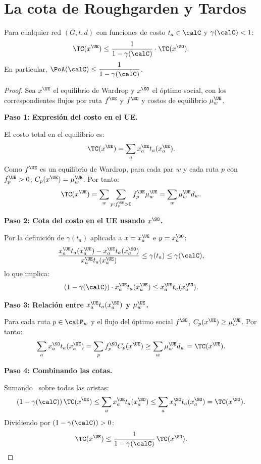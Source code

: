 \section{La cota de Roughgarden y Tardos}

\begin{theorem}\label{thm:roughgarden_tardos}
Para cualquier red $(G, t, d)$ con funciones de costo $t_a \in \calC$ y $\gamma(\calC) < 1$:
\[
\TC(x^{\UE}) \leq \frac{1}{1 - \gamma(\calC)} \cdot \TC(x^{\SO}).
\]
En particular, $\PoA(\calC) \leq \dfrac{1}{1 - \gamma(\calC)}$.
\end{theorem}

\begin{proof}
Sea $x^{\UE}$ el equilibrio de Wardrop y $x^{\SO}$ el óptimo social, con los correspondientes flujos por ruta $f^{\UE}$ y $f^{\SO}$ y costos de equilibrio $\mu_w^{\UE}$.

\textbf{Paso 1: Expresión del costo en el UE.}

El costo total en el equilibrio es:
\[
\TC(x^{\UE}) = \sum_{a} x_a^{\UE} t_a(x_a^{\UE}).
\]
Como $f^{\UE}$ es un equilibrio de Wardrop, para cada par $w$ y cada ruta $p$ con $f_p^{\UE} > 0$, $C_p(x^{\UE}) = \mu_w^{\UE}$. Por tanto:
\[
\TC(x^{\UE}) = \sum_w \sum_{p: f_p^{\UE} > 0} f_p^{\UE} \mu_w^{\UE} = \sum_w \mu_w^{\UE} d_w.
\]

\textbf{Paso 2: Cota del costo en el UE usando $x^{\SO}$.}

Por la definición de $\gamma(t_a)$ aplicada a $x = x_a^{\UE}$ e $y = x_a^{\SO}$:
\[
\frac{x_a^{\UE} t_a(x_a^{\UE}) - x_a^{\UE} t_a(x_a^{\SO})}{x_a^{\UE} t_a(x_a^{\UE})} \leq \gamma(t_a) \leq \gamma(\calC),
\]
lo que implica:
\begin{equation}\label{eq:gamma_bound}
(1 - \gamma(\calC)) \cdot x_a^{\UE} t_a(x_a^{\UE}) \leq x_a^{\UE} t_a(x_a^{\SO}).
\end{equation}

\textbf{Paso 3: Relación entre $x_a^{\UE} t_a(x_a^{\SO})$ y $\mu_w^{\UE}$.}

Para cada ruta $p \in \calP_w$ y el flujo del óptimo social $f^{\SO}$, $C_p(x^{\UE}) \geq \mu_w^{\UE}$. Por tanto:
\begin{equation}\label{eq:sum_bound}
\sum_a x_a^{\SO} t_a(x_a^{\UE}) = \sum_p f_p^{\SO} C_p(x^{\UE}) \geq \sum_w \mu_w^{\UE} d_w = \TC(x^{\UE}).
\end{equation}

\textbf{Paso 4: Combinando las cotas.}

Sumando~ sobre todas las aristas:
\[
(1 - \gamma(\calC))\, \TC(x^{\UE}) \leq \sum_a x_a^{\UE} t_a(x_a^{\SO}) \leq \sum_a x_a^{\SO} t_a(x_a^{\SO}) = \TC(x^{\SO}).
\]
Dividiendo por $(1 - \gamma(\calC)) > 0$:
\[
\TC(x^{\UE}) \leq \frac{1}{1 - \gamma(\calC)}\, \TC(x^{\SO}). \qedhere
\]
\end{proof}


